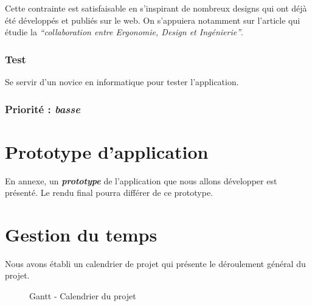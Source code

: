 Cette contrainte est satisfaisable en s’inspirant de nombreux designs qui ont déjà été développés et publiés sur le web. On s’appuiera notamment sur l’article \cite{lente2014scenariser} qui étudie la \textit{“collaboration entre Ergonomie, Design et Ingénierie”}.

\subsubsection{Test}

Se servir d'un novice en informatique pour tester l’application.

\subsubsection{Priorité : \textit{basse}}


\section{Prototype d'application}

  En annexe, un \textbf{\textit{prototype}} de l'application que nous allons développer est présenté. Le rendu final pourra différer de ce prototype.


\section{Gestion du temps}
  
Nous avons établi un calendrier de projet qui présente le déroulement général du projet.

\begin{figure}[!ht]
  \begin{center}
    \caption{\label{gantt} Gantt - Calendrier du projet}
  \end{center}   
\end{figure}


